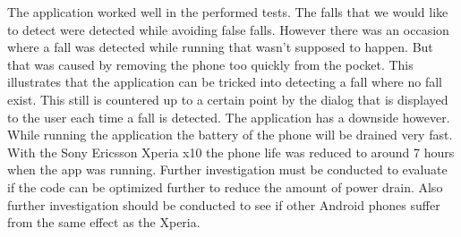 \documentclass[a4paper, 10pt]{article}
\begin{document}
The application worked well in the performed tests. The falls that we would like to detect were detected while avoiding false falls. However there was an occasion where a fall was detected while running that wasn’t supposed to happen.  But that was caused by removing the phone too quickly from the pocket. This illustrates that the application can be tricked into detecting a fall where no fall exist. This still is countered up to a certain point by the dialog that is displayed to the user each time a fall is detected. The application has a downside however. While running the application the battery of the phone will be drained very fast. With the Sony Ericsson Xperia x10 the phone life was reduced to around 7 hours when the app was running. Further investigation must be conducted to evaluate if the code can be optimized further to reduce the amount of power drain. Also further investigation should be conducted to see if other Android phones suffer from the same effect as the Xperia.  
\end{document}
